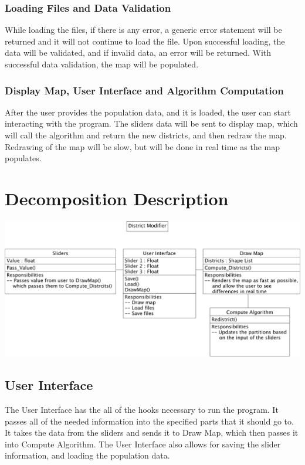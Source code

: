 \documentclass{article}
\begin{document}
\subsubsection{Loading Files and Data Validation}
While loading the files, if there is any error, a generic error statement will be returned and it will not continue to load the file.
Upon successful loading, the data will be validated, and if invalid data, an error will be returned. With successful data validation, the map will be populated.
\subsubsection{Display Map, User Interface and Algorithm Computation}
After the user provides the population data, and it is loaded, the user can start interacting with the program. The sliders data will be sent to display map, which will call the algorithm and return the new districts, and then redraw the map. Redrawing of the map will be slow, but will be done in real time as the map populates.

\section{Decomposition Description}

\vspace{2.5mm}
\begin{center}
\includegraphics[scale=.11]{Decomposition.png}
\end{center}
\vspace{2.5mm}

\subsection{User Interface}
The User Interface has the all of the hooks necessary to run the program. It passes all of the needed information into the specified parts that it should go to. It takes the data from the sliders and sends it to Draw Map, which then passes it into Compute Algorithm. The User Interface also allows for saving the slider information, and loading the population data.
\end{document}
